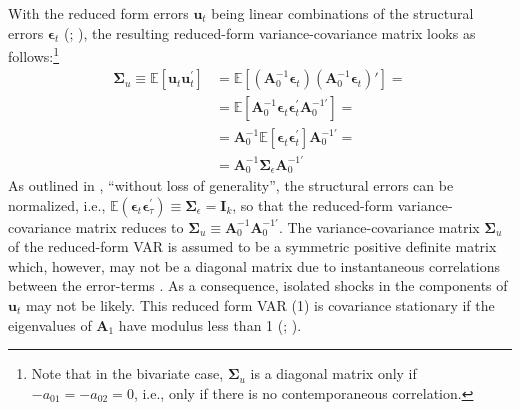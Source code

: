 \documentclass[a4paper,11pt,listof=nochaptergap,oneside,pointednumbers,bibtotoc,bigheadings,liststotoc,hidelinks]{scrbook}
\theoremstyle{mysatz}
\theoremstyle{mydefinition}
\theoremstyle{mytheorem}
\theoremstyle{mybemerkung}
\newcommand{\vect}[1]{\boldsymbol{\mathbf{#1}}}
\begin{document}
With the reduced form errors $\vect{u}_t$ being linear combinations of the structural errors $\vect{\epsilon}_t$ (\citealp{lutkepohlkilian:17}; \citealp{zivot:00}), the resulting reduced-form variance-covariance matrix looks as follows:\footnote{Note that in the bivariate case, $\vect{\Sigma}_u$ is a diagonal matrix only if $-a_{01} = -a_{02} = 0$, i.e., only if there is no contemporaneous correlation.}
\begin{equation} \label{eq:svar6}
\begin{split}
 		\vect{\Sigma}_u \equiv \mathbb{E}[\vect{u}_t\vect{u}_t^'] & = \mathbb{E}[(\vect{A}_0^{-1}\vect{\epsilon}_t) (\vect{A}_0^{-1}\vect{\epsilon}_t)' ] = \\
		& = \mathbb{E}[\vect{A}_0^{-1}\vect{\epsilon}_t \vect{\epsilon}_t^'\vect{A}_0^{-1'}] = \\
		& = \vect{A}_0^{-1}\mathbb{E}[\vect{\epsilon}_t \vect{\epsilon}_t^']\vect{A}_0^{-1'} = \\
		& = \vect{A}_0^{-1}\vect{\Sigma}_\epsilon\vect{A}_0^{-1'}
\end{split}								
\end{equation}
As outlined in \citet[p. 109]{lutkepohlkilian:17}, ``without loss of generality'', the structural errors can be normalized, i.e., $\mathbb{E}(\vect{\epsilon}_t\vect{\epsilon}_{\tau}^') \equiv \vect{\Sigma}_\epsilon = \vect{\mathbf{I}}_k$, so that the reduced-form variance-covariance matrix reduces to $\vect{\Sigma}_u \equiv \vect{A}_0^{-1}\vect{A}_0^{-1'}$. The variance-covariance matrix $\vect{\Sigma}_u$ of the reduced-form VAR is assumed to be a symmetric positive definite matrix \citep{lutkepohlkilian:17} which, however, may not be a diagonal matrix due to instantaneous correlations between the error-terms \citep{zivot:00}. As a consequence, isolated shocks in the components of $\vect{u}_t$ may not be likely. This reduced form VAR (1) is covariance stationary if the eigenvalues of $\vect{A}_1$ have modulus less than 1 (\citealp{lutkepohlkilian:17}; \citealp{zivot:00}).
\end{document}
